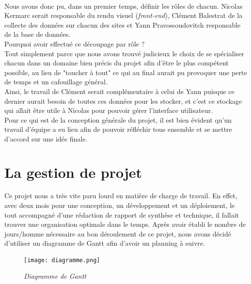 \documentclass{report}
\begin{document}
\paragraph{}
Nous avons donc pu, dans un premier temps, définir les rôles de chacun. Nicolas Kermarc serait responsable du rendu visuel (\textit{front-end}), Clément Balestrat de la collecte des données sur chacun des sites et Yann Pravossoudovitch responsable de la base de données. \\Pourquoi avoir effectué ce découpage par rôle ? \\Tout simplement parce que nous avons trouvé judicieux le choix de se spécialiser chacun dans un domaine bien précis du projet afin d'être le plus compétent possible, au lieu de "toucher à tout" ce qui au final aurait pu provoquer une perte de temps et un cafouillage général.\\
Ainsi, le travail de Clément serait complémentaire à celui de Yann puisque ce dernier aurait besoin de toutes ces données pour les stocker, et c'est ce stockage qui allait être utile à Nicolas pour pouvoir gérer l'interface utilisateur.\\
Pour ce qui est de la conception générale du projet, il est bien évident qu'un travail d'équipe a eu lieu afin de pouvoir réfléchir tous ensemble et se mettre d'accord sur une idée finale.

\section{La gestion de projet}

\paragraph{}

Ce projet nous a très vite paru lourd en matière de charge de travail. En effet, avec deux mois pour une conception, un développement et un déploiement, le tout accompagné d'une rédaction de rapport de synthèse et technique, il fallait trouver une organisation optimale dans le temps. Après avoir établi le nombre de jours/homme nécessaire au bon déroulement de ce projet, nous avons décidé d'utiliser un diagramme de Gantt afin d'avoir un planning à suivre.

\begin{figure}[H]
\begin{center}
\texttt{[image: diagramme.png]}
\caption{\textit{Diagramme de Gantt}}
\end{center}
\end{figure}
\end{document}
